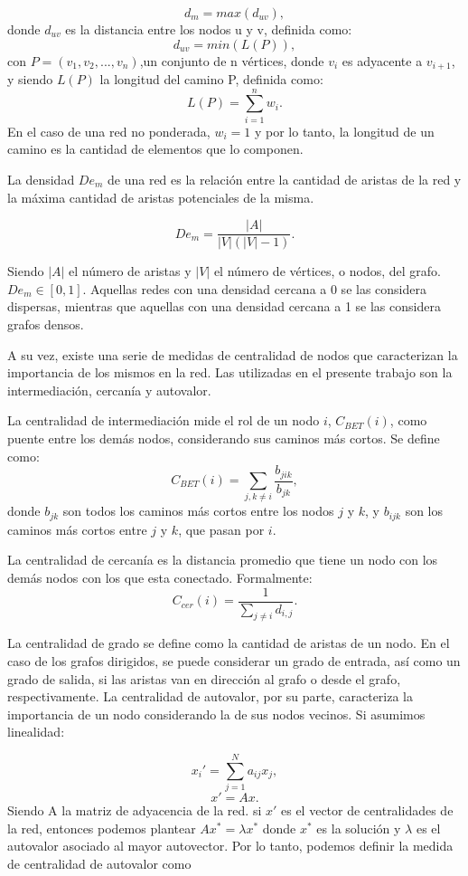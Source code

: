 \documentclass[class=article, crop=false]{standalone}
\begin{document}
$$
d_m = max(d_{uv}),
$$
donde $d_{uv}$ es la distancia entre los nodos u y v, definida como:
$$
d_{uv} = min(L(P)),
$$
con $P = (v_1, v_2, ..., v_n)$,un conjunto de n vértices, donde $v_i$ es adyacente a $v_{i+1}$, y siendo $L(P)$ la longitud del camino P, definida como:
$$
L(P) = \sum_{i=1}^{n} w_i.
$$
En el caso de una red no ponderada, $w_i = 1$ y por lo tanto, la longitud de un camino es la cantidad de elementos que lo componen. \par
La densidad $De_m$ de una red es la relación entre la cantidad de aristas de la red y la máxima cantidad de aristas potenciales de la misma. 

$$
De_m = \frac{|A|}{|V|(|V|-1)}.
$$

Siendo $|A|$ el número de aristas y $|V|$ el número de vértices, o nodos, del grafo. $De_m \in [0,1]$. Aquellas redes con una densidad cercana a 0 se las considera dispersas, mientras que aquellas con una densidad cercana a 1 se las considera grafos densos. \par

A su vez, existe una serie de medidas de centralidad de nodos que caracterizan la importancia de los mismos en la red. Las utilizadas en el presente trabajo son la intermediación, cercanía y autovalor. \par
La centralidad de intermediación mide el rol de un nodo $i$, $C_{BET}(i)$, como puente entre los demás nodos, considerando sus caminos más cortos. Se define como:
$$
C_{BET}(i) = \sum_{j,k \neq i} \frac{b_{jik}}{b_{jk}},
$$
donde $b_{jk}$ son todos los caminos más cortos entre los nodos $j$ y $k$, y $b_{ijk}$ son los caminos más cortos entre $j$ y $k$, que pasan por $i$. \par
La centralidad de cercanía es la distancia promedio que tiene un nodo con los demás nodos con los que esta conectado. Formalmente: 
$$
C_{cer}(i) = \frac{1}{\displaystyle \sum_{j \neq i} d_{i,j} }.
$$

La centralidad de grado se define como la cantidad de aristas de un nodo. En el caso de los grafos dirigidos, se puede considerar un grado de entrada, así como un grado de salida, si las aristas van en dirección al grafo o desde el grafo, respectivamente.
La centralidad de autovalor, por su parte, caracteriza la importancia de un nodo considerando la de sus nodos vecinos. Si asumimos linealidad:

$$
x_i'= \sum_{j=1}^{N} a_{ij}x_{j},
$$
$$
x' = Ax.
$$
Siendo A la matriz de adyacencia de la red. si $x'$ es el vector de centralidades de la red, entonces podemos plantear $Ax^* = \lambda x^*$ donde $x^*$ es la solución y  $\lambda$ es el autovalor asociado al mayor autovector.  Por lo tanto, podemos definir la medida de centralidad de autovalor como
\end{document}
